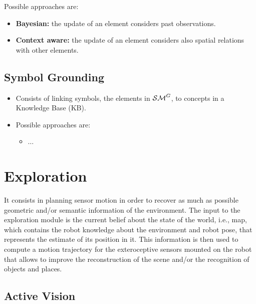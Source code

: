 \documentclass[letterpaper, 10 pt, conference]{ieeeconf}  %
\begin{document}
Possible approaches are:
\begin{itemize}
	\item {\bf Bayesian:} the update of an element considers past observations.
	\item {\bf Context aware:} the update of an element considers also spatial relations with other elements.
\end{itemize}

\subsection{Symbol Grounding}

\begin{itemize}
	\item Consists of linking symbols, the elements in $\mathcal{SM}^G$, to concepts in a Knowledge Base (KB).
	\item Possible approaches are:
	\begin{itemize}
		\item $\dots$
	\end{itemize}
\end{itemize}	

\section{Exploration}
\label{sec:exploration}

It consists in planning sensor motion in order to recover as much as possible geometric and/or semantic information of the environment. The input to the exploration module is the current belief about the state of the world, i.e., map, which contains the robot knowledge about the environment and robot pose, that represents the estimate of its position in it. This information is then used to compute a motion trajectory for the exteroceptive sensors mounted on the robot that allows to improve the reconstruction of the scene and/or the recognition of objects and places.

%

\subsection{Active Vision}
\end{document}
